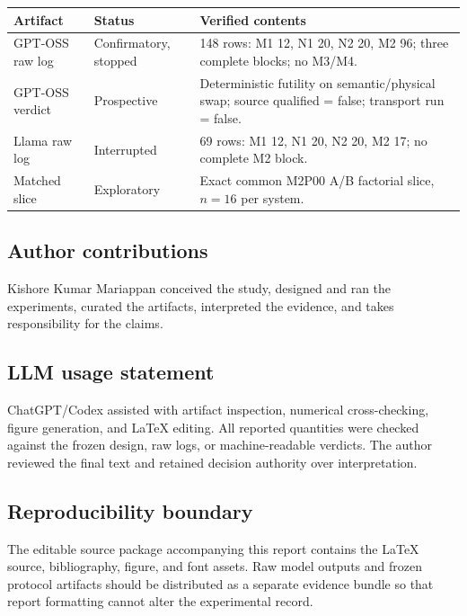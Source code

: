 \documentclass[11pt,letterpaper]{article}
\begin{document}
\small
\begin{tabularx}{\textwidth}{@{}p{}p{}Y@{}}
\toprule
\textbf{Artifact} & \textbf{Status} & \textbf{Verified contents} \\
\midrule
GPT-OSS raw log & Confirmatory, stopped & 148 rows: M1 12, N1 20, N2 20, M2 96; three complete blocks; no M3/M4. \\
GPT-OSS verdict & Prospective & Deterministic futility on semantic/physical swap; source qualified = false; transport run = false. \\
Llama raw log & Interrupted & 69 rows: M1 12, N1 20, N2 20, M2 17; no complete M2 block. \\
Matched slice & Exploratory & Exact common M2P00 A/B factorial slice, $n=16$ per system. \\
\bottomrule
\end{tabularx}

\subsection*{Author contributions}
Kishore Kumar Mariappan conceived the study, designed and ran the experiments,
curated the artifacts, interpreted the evidence, and takes responsibility for
the claims.

\subsection*{LLM usage statement}
ChatGPT/Codex assisted with artifact inspection, numerical cross-checking,
figure generation, and LaTeX editing. All reported quantities were checked
against the frozen design, raw logs, or machine-readable verdicts. The author
reviewed the final text and retained decision authority over interpretation.

\subsection*{Reproducibility boundary}
The editable source package accompanying this report contains the LaTeX source,
bibliography, figure, and font assets. Raw model outputs and frozen protocol
artifacts should be distributed as a separate evidence bundle so that report
formatting cannot alter the experimental record.
\end{document}
